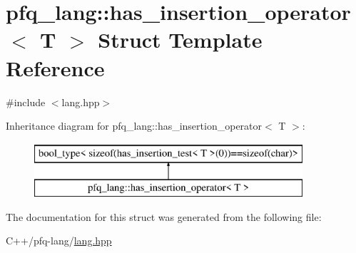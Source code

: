 \hypertarget{structpfq__lang_1_1has__insertion__operator}{\section{pfq\+\_\+lang\+:\+:has\+\_\+insertion\+\_\+operator$<$ T $>$ Struct Template Reference}
\label{structpfq__lang_1_1has__insertion__operator}
}


{\ttfamily \#include $<$lang.\+hpp$>$}

Inheritance diagram for pfq\+\_\+lang\+:\+:has\+\_\+insertion\+\_\+operator$<$ T $>$\+:\begin{figure}[H]
\begin{center}
\leavevmode
\includegraphics[height=2.000000cm]{structpfq__lang_1_1has__insertion__operator}
\end{center}
\end{figure}


The documentation for this struct was generated from the following file\+:\begin{DoxyCompactItemize}
\item 
C++/pfq-\/lang/\hyperlink{lang_8hpp}{lang.\+hpp}\end{DoxyCompactItemize}
